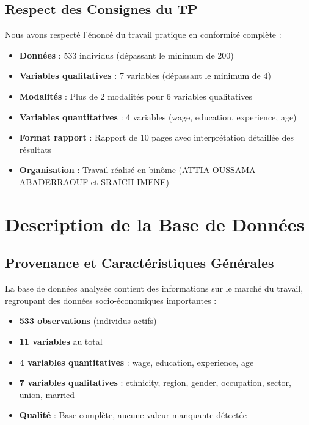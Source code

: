 \documentclass[12pt,a4paper]{report}
\begin{document}
\subsection{Respect des Consignes du TP}

Nous avons respecté l'énoncé du travail pratique en conformité complète :

\begin{itemize}
    \item \textbf{Données} : 533 individus (dépassant le minimum de 200)
    \item \textbf{Variables qualitatives} : 7 variables (dépassant le minimum de 4)
    \item \textbf{Modalités} : Plus de 2 modalités pour 6 variables qualitatives
    \item \textbf{Variables quantitatives} : 4 variables (wage, education, experience, age)
    \item \textbf{Format rapport} : Rapport de 10 pages avec interprétation détaillée des résultats
    \item \textbf{Organisation} : Travail réalisé en binôme (ATTIA OUSSAMA ABADERRAOUF et SRAICH IMENE)
\end{itemize}

\section{Description de la Base de Données}

\subsection{Provenance et Caractéristiques Générales}

La base de données analysée contient des informations sur le marché du travail, regroupant des données socio-économiques importantes :

\begin{itemize}
    \item \textbf{533 observations} (individus actifs)
    \item \textbf{11 variables} au total
    \item \textbf{4 variables quantitatives} : wage, education, experience, age
    \item \textbf{7 variables qualitatives} : ethnicity, region, gender, occupation, sector, union, married
    \item \textbf{Qualité} : Base complète, aucune valeur manquante détectée
\end{itemize}
\end{document}
